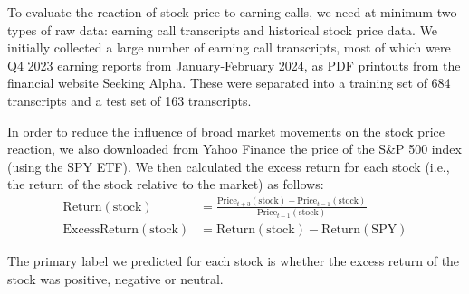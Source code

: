 \documentclass{article}
\begin{document}
To evaluate the reaction of stock price to earning calls, we need at minimum two types of raw data: earning call transcripts and historical stock price data.
We initially collected a large number of earning call transcripts, most of which were Q4 2023 earning reports from January-February 2024, as PDF printouts from the financial website Seeking Alpha.
These were separated into a training set of 684 transcripts and a test set of 163 transcripts.

In order to reduce the influence of broad market movements on the stock price reaction, we also downloaded from Yahoo Finance the price of the S\&P 500 index (using the SPY ETF).
We then calculated the excess return for each stock (i.e., the return of the stock relative to the market) as follows:
\begin{align*}
  \text{Return}(\text{stock}) &= \frac{\text{Price}_{t+3}(\text{stock})-\text{Price}_{t-1}(\text{stock})}{\text{Price}_{t-1}(\text{stock})} \\
  \text{ExcessReturn}(\text{stock}) &= \text{Return}(\text{stock}) - \text{Return}(\text{SPY})
\end{align*}

The primary label we predicted for each stock is whether the excess return of the stock was positive, negative or neutral.
\end{document}
